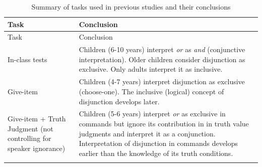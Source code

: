 \documentclass[floatsintext,man]{apa6}
\theoremstyle{definition}
\theoremstyle{definition}
\theoremstyle{definition}
\theoremstyle{remark}
\begin{document}
\begin{longtable}[]{@{}ll@{}}
\caption{\label{tab:conclusionsReview} Summary of tasks used in previous
studies and their conclusions}\tabularnewline
\toprule
\begin{minipage}[b]{0.30\columnwidth}\raggedright\strut
Task\strut
\end{minipage} & \begin{minipage}[b]{0.64\columnwidth}\raggedright\strut
Conclusion\strut
\end{minipage}\tabularnewline
\midrule
\endfirsthead
\toprule
\begin{minipage}[b]{0.30\columnwidth}\raggedright\strut
Task\strut
\end{minipage} & \begin{minipage}[b]{0.64\columnwidth}\raggedright\strut
Conclusion\strut
\end{minipage}\tabularnewline
\midrule
\endhead
\begin{minipage}[t]{0.30\columnwidth}\raggedright\strut
In-class tests\strut
\end{minipage} & \begin{minipage}[t]{0.64\columnwidth}\raggedright\strut
Children (6-10 years) interpret \emph{or} as \emph{and} (conjunctive
interpretation). Older children consider disjunction as exclusive. Only
adults interpret it as inclusive.\strut
\end{minipage}\tabularnewline
\begin{minipage}[t]{0.30\columnwidth}\raggedright\strut
Give-item\strut
\end{minipage} & \begin{minipage}[t]{0.64\columnwidth}\raggedright\strut
Children (4-7 years) interpret disjunction as exclusive (choose-one).
The inclusive (logical) concept of disjunction develops later.\strut
\end{minipage}\tabularnewline
\begin{minipage}[t]{0.30\columnwidth}\raggedright\strut
Give-item + Truth Judgment (not controlling for speaker ignorance)\strut
\end{minipage} & \begin{minipage}[t]{0.64\columnwidth}\raggedright\strut
Children (5-6 years) interpret \emph{or} as exclusive in commands but
ignore its contribution in in truth value judgments and interpret it as
a conjunction. Interpretation of disjunction in commands develops
earlier than the knowledge of its truth conditions.\strut
\end{minipage}\tabularnewline
\begin{minipage}[t]{0.30\columnwidth}\raggedright\strut

\end{minipage}
\end{longtable}
\end{document}

